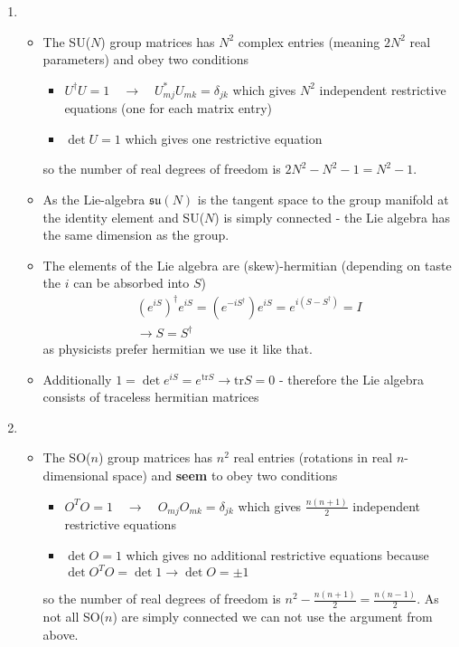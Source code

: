\documentclass[10pt,a4paper]{article}
\theoremstyle{definition}
\begin{document}
\begin{enumerate}
\item
\begin{itemize}
\item The SU($N$) group matrices has $N^2$ complex entries (meaning $2N^2$ real parameters) and  obey two conditions  
\begin{itemize}
\item $U^\dagger U=1\quad \rightarrow\quad U^*_{mj}U_{mk}=\delta_{jk}$ which gives $N^2$ independent restrictive equations (one for each matrix entry)
\item $\det U=1$ which gives one restrictive equation
\end{itemize}
so the number of real degrees of freedom is $2N^2-N^2-1=N^2-1$.

\item As the Lie-algebra $\mathfrak{su}(N)$ is the tangent space to the group manifold at the identity element and SU($N$) is simply connected - the Lie algebra has the same dimension as the group.

\item The elements of the Lie algebra are (skew)-hermitian (depending on taste the $i$ can be absorbed into $S$)
\begin{align}
(e^{iS})^\dagger e^{iS}=(e^{-iS^\dagger}) e^{iS}=e^{i(S-S^\dagger)}=I\\
\rightarrow S=S^\dagger
\end{align}
as physicists prefer hermitian we use it like that.
\item Additionally $1=\det e^{iS}=e^{\text{tr} S}\rightarrow\text{tr} S=0$ - therefore the Lie algebra consists of traceless hermitian matrices 


\end{itemize}

\item
\begin{itemize}
\item The SO($n$) group matrices has $n^2$ real entries (rotations in real $n$-dimensional space) and {\bf seem} to obey two conditions  
\begin{itemize}
\item $O^T O=1\quad \rightarrow\quad O_{mj}O_{mk}=\delta_{jk}$ which gives $\frac{n(n+1)}{2}$ independent restrictive equations
\item $\det O=1$ which gives no additional restrictive equations because $\det O^T O=\det1\rightarrow\det O=\pm1$
\end{itemize}
so the number of real degrees of freedom is $n^2-\frac{n(n+1)}{2}=\frac{n(n-1)}{2}$. As not all SO($n$) are simply connected we can not use the argument from above.


\end{itemize}
\end{enumerate}
\end{document}
